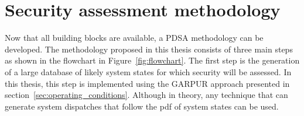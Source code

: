\section{Security assessment methodology}
\label{sec:PDSA_methodology}

Now that all building blocks are available, a PDSA methodology can be developed. The methodology proposed in this thesis consists of three main steps as shown in the flowchart in Figure~\ref{fig:flowchart}. The first step is the generation of a large database of likely system states for which security will be assessed. In this thesis, this step is implemented using the GARPUR approach presented in section~\ref{sec:operating_conditions}. Although in theory, any technique that can generate system dispatches that follow the pdf of system states can be used.



